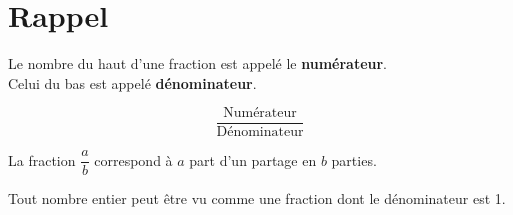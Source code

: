 \section{Rappel}

{   \begin{minipage}{0.7\textwidth}
        Le nombre du haut d'une fraction est appelé le \textbf{numérateur}. 
        \\Celui du bas est appelé \textbf{dénominateur}.
    \end{minipage}
    \hfil
    \begin{minipage}{0.25\textwidth}
        $$\dfrac{\text{Numérateur}}{\text{Dénominateur}}$$
    \end{minipage}
}


{La fraction $\dfrac{a}{b}$ correspond à $a$ part d'un partage en $b$ parties. 
}


{Tout nombre entier peut être vu comme une fraction dont le dénominateur est 1.}

